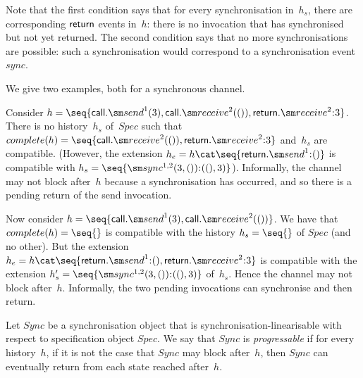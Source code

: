 Note that the first condition says that for every synchronisation in~$h_s$,
there are corresponding $\mathsf{return}$ events in~$h$: there is no invocation that
has synchronised but not yet returned.  The second condition says that no more
synchronisations are possible: such a synchronisation would correspond to a
synchronisation event~$sync$.


We give two examples, both for a synchronous channel.
%
\begin{example}
Consider $h = \seq{ \call.\send^1(3), \call.\receive^2(()),
  \return.\receive^2\::3 }$.  There is no history~$h_s$ of~$Spec$ such that
$complete(h) = \seq{\call.\receive^2(()),\linebreak[1] \return.\receive^2\::3
}$ and~$h_s$ are compatible.  (However, the extension $h_e = h \cat \seq{
  \return.\send^1 \:: () }$ is compatible with $h_s =
\seq{\sync^{1,2}(3,())\::((),3) }$).  Informally, the channel may not block
after~$h$ because a synchronisation has occurred, and so there is a pending
return of the send invocation.
\end{example}

\begin{example}
Now consider $h = \seq{\call.\send^1(3), \call.\receive^2(())}$.  We have that
$complete(h) = \seq{}$ is compatible with the history $h_s = \seq{}$ of $Spec$
(and no other). But the extension $h_e = h \cat
\seq{\return.\send^1\::(),\linebreak[1] \return.\receive^2\::3}$ is compatible
with the extension $h_s' = \linebreak[1] \seq{\sync^{1,2}(3,()) \:: ((),3)}$
of~$h_s$.  Hence the channel may not block after~$h$.  Informally, the two
pending invocations can synchronise and then return. 
\end{example}



\begin{definition}
Let $Sync$ be a synchronisation object that is synchronisation-linearisable
with respect to specification object $Spec$.  We say that $Sync$ is
\emph{progressable} if for every history~$h$, if it is not the case that $Sync$
may block after~$h$, then $Sync$ can eventually return from each state reached
after~$h$.
\end{definition}





